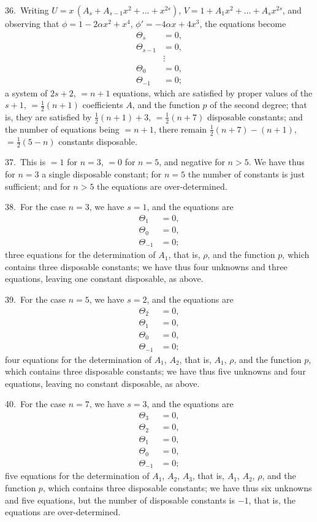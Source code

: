 \documentclass[11pt,a4paper]{book}
\begin{document}
36.\ Writing $U = x\, (A_s + A_{s-1} x^2 + \ldots + x^{2s})$, $V = 1 + A_1 x^2 + \ldots + A_s x^{2s}$,
and observing that $\phi = 1 - 2\alpha x^2 + x^4$, $\phi' = -4\alpha x + 4x^3$, the equations become
\begin{align*}
\Theta_s &= 0,\\
\Theta_{s-1} &= 0,\\
&\vdots\\
\Theta_0 &= 0,\\
\Theta_{-1} &= 0;
\end{align*}
a system of $2s + 2$, $= n + 1$ equations, which are satisfied by proper values of the
$s + 1$, $= \tfrac12(n + 1)$ coefficients $A$, and the function $p$ of the second degree; that is, they
are satisfied by $\tfrac12(n + 1) + 3$, $= \tfrac12(n + 7)$ disposable constants; and the number of equations
being $= n + 1$, there remain $\tfrac12(n + 7) - (n + 1)$, $= \tfrac12(5 - n)$ constants disposable.

37.\ This is $= 1$ for $n = 3$, $= 0$ for $n = 5$, and negative for $n > 5$. We have thus
for $n = 3$ a single disposable constant; for $n = 5$ the number of constants is just
sufficient; and for $n > 5$ the equations are over-determined.

38.\ For the case $n = 3$, we have $s = 1$, and the equations are
\begin{align*}
\Theta_1 &= 0,\\
\Theta_0 &= 0,\\
\Theta_{-1} &= 0;
\end{align*}
three equations for the determination of $A_1$, that is, $\rho$, and the function $p$, which
contains three disposable constants; we have thus four unknowns and three equations,
leaving one constant disposable, as above.

39.\ For the case $n = 5$, we have $s = 2$, and the equations are
\begin{align*}
\Theta_2 &= 0,\\
\Theta_1 &= 0,\\
\Theta_0 &= 0,\\
\Theta_{-1} &= 0;
\end{align*}
four equations for the determination of $A_1$, $A_2$, that is, $A_1$, $\rho$, and the function $p$,
which contains three disposable constants; we have thus five unknowns and four equations,
leaving no constant disposable, as above.

40.\ For the case $n = 7$, we have $s = 3$, and the equations are
\begin{align*}
\Theta_3 &= 0,\\
\Theta_2 &= 0,\\
\Theta_1 &= 0,\\
\Theta_0 &= 0,\\
\Theta_{-1} &= 0;
\end{align*}
five equations for the determination of $A_1$, $A_2$, $A_3$, that is, $A_1$, $A_2$, $\rho$, and the
function $p$, which contains three disposable constants; we have thus six unknowns and
five equations, but the number of disposable constants is $-1$, that is, the equations are
over-determined.
\end{document}
